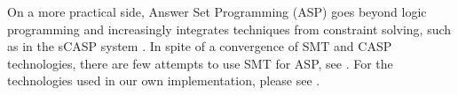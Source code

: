 On a more practical side, Answer Set Programming (ASP) \cite{asp_background}
goes beyond logic programming and increasingly integrates techniques from
constraint solving, such as in the sCASP system
\cite{arias_phd_2019}. In spite of a convergence of SMT and CASP technologies,
there are few attempts to use SMT for ASP, see
\cite{shen_lierler_smt_answer_set_kr_2018}. For the technologies used in our
own implementation, please see . 



